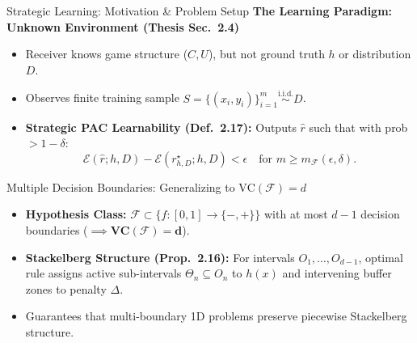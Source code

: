 \documentclass[aspectratio=169, 11pt, t, xcolor=table]{beamer}
\newcommand{\cg}[1]{\mathcal{#1}}
\newcommand{\eps}{\epsilon}
\newcommand{\dlt}{\delta}
\newcommand{\minus}{\mathbf{-}}
\newcommand{\plus}{\mathbf{+}}
\newcommand{\rs}{r^{\star}}
\begin{document}
\begin{frame}{Strategic Learning: Motivation \& Problem Setup}
\small
\textbf{The Learning Paradigm: Unknown Environment (Thesis Sec.\ 2.4)}
\begin{itemize}\itemsep=0.5pt
  \footnotesize
  \item Receiver knows game structure ($C, U$), but not ground truth $h$ or distribution $D$.
  \item Observes finite training sample $S = \{(x_i, y_i)\}_{i=1}^m \stackrel{\text{i.i.d.}}{\sim} D$.
  \item \textbf{Strategic PAC Learnability (Def.\ 2.17):} Outputs $\hat{r}$ such that with prob $> 1-\delta$:
  \[
    \cg{E}(\hat{r}; h, D) - \cg{E}(\rs_{h,D}; h, D) < \eps \quad \text{for } m \ge m_{\cg{F}}(\eps,\dlt).
  \]
\end{itemize}

\vspace{0.1em}
\begin{block}{Multiple Decision Boundaries: Generalizing to $\text{VC}(\cg{F}) = d$}
\footnotesize
\begin{itemize}\itemsep=0.5pt
  \item \textbf{Hypothesis Class:} $\cg{F} \subset \{f: [0,1] \to \{\minus, \plus\}\}$ with at most $d-1$ decision boundaries ($\implies \mathbf{\text{VC}(\cg{F}) = d}$).
  \item \textbf{Stackelberg Structure (Prop.\ 2.16):} For intervals $O_1, \dots, O_{d-1}$, optimal rule assigns active sub-intervals $\Theta_n \subseteq O_n$ to $h(x)$ and intervening buffer zones to penalty $\Delta$.
  \item Guarantees that multi-boundary 1D problems preserve piecewise Stackelberg structure.
\end{itemize}
\end{block}
\end{frame}
\end{document}
